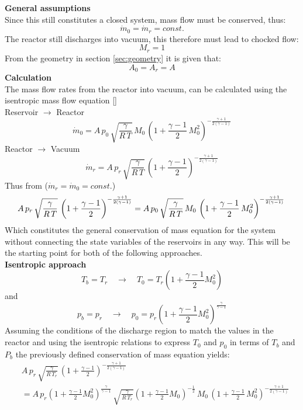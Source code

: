 \textbf{General assumptions}\\
Since this still constitutes a closed system, mass flow must be conserved, thus:
$$
	\dot{m}_0 = \dot{m}_r = const.
$$
The reactor still discharges into vacuum, this therefore must lead to chocked flow:
$$
	M_r = 1
$$
From the geometry in section \ref{sec:geometry} it is given that:
$$
	A_0 = A_r = A
$$
\textbf{Calculation}\\
The mass flow rates from the reactor into vacuum, can be calculated using the isentropic mass flow equation \eqref{}\\
Reservoir $\to$ Reactor
$$
	\dot{m}_0 = A\, p_0\, \sqrt{\frac{\gamma}{R\,T}}\, M_0\,\left(1+\frac{\gamma-1}{2}\,M_0^2\right)^{-\frac{\gamma+1}{2(\gamma-1)}}
$$
Reactor $\to$ Vacuum
$$
	\dot{m}_r = A\, p_r\, \sqrt{\frac{\gamma}{R\,T}}\,\left(1+\frac{\gamma-1}{2}\right)^{-\frac{\gamma+1}{2(\gamma-1)}}
$$
Thus from ($\dot{m}_r = \dot{m}_0 = const.$)
$$
	A\, p_r\, \sqrt{\frac{\gamma}{R\,T}}\,\left(1+\frac{\gamma-1}{2}\right)^{-\frac{\gamma+1}{2(\gamma-1)}}
	=  A\, p_0\, \sqrt{\frac{\gamma}{R\,T}}\, M_0\,\left(1+\frac{\gamma-1}{2}\,M_0^2\right)^{-\frac{\gamma+1}{2(\gamma-1)}}\\\\
$$
Which constitutes the general conservation of mass equation for the system without connecting the state variables of the reservoirs in any way.
This will be the starting point for both of the following approaches.\\
\textbf{Isentropic approach}\\
$$
	T_b = T_r
	\quad \to \quad
	T_0 = T_r \left(1 + \frac{\gamma - 1}{2}M_0^2 \right)
$$
and
$$
	p_b = p_r
	\quad \to \quad
	p_0 = p_r \left(1 + \frac{\gamma - 1}{2}M_0^2 \right)^{\frac{\gamma}{\gamma - 1}}
$$
Assuming the conditions of the discharge region to match the values in the reactor and using the isentropic relations to express $T_0$ and $p_0$ in terms of $T_b$ and $P_b$ the previously defined conservation of mass equation yields:
\begin{align*}
	&A\, p_r\, \sqrt{\frac{\gamma}{R\,T_r}}\,\left(1+\frac{\gamma-1}{2}\right)^{-\frac{\gamma+1}{2(\gamma-1)}}\\
	&= A\, p_r\left(1 + \frac{\gamma - 1}{2}M_0^2\right)^{\frac{\gamma}{\gamma-1}}\, \sqrt{\frac{\gamma}{R\,T_r}}\left(1 + \frac{\gamma - 1}{2}M_0\right)^{-\frac{1}{2}}\, M_0\,\left(1+\frac{\gamma-1}{2}\,M_0^2\right)^{-\frac{\gamma+1}{2(\gamma-1)}}\\\\
\end{align*}
